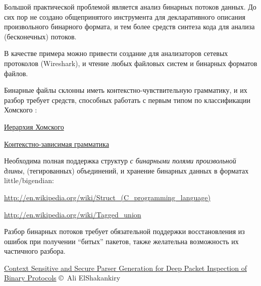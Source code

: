 \label{binparse}

Большой практической проблемой является анализ бинарных потоков данных. До сих
пор не создано общепринятого инструмента для декларативного описания
произвольного бинарного формата, и тем более средств синтеза кода для анализа
(бесконечных) потоков.

В качестве примера можно привести создание  для анализаторов
сетевых протоколов (Wireshark), и чтение любых файловых систем и бинарных
форматов файлов.
 
Бинарные файлы склонны иметь контекстно-чувствительную грамматику, и их разбор
требует средств, способных работать с первым типом по классификации Хомского
\cite{serlex}:

\medskip
\noindent
\href{http://ru.wikipedia.org/wiki/%D0%98%D0%B5%D1%80%D0%B0%D1%80%D1%85%D0%B8%D1%8F_%D0%A5%D0%BE%D0%BC%D1%81%D0%BA%D0%BE%D0%B3%D0%BE}{Иерархия
Хомского} 

\noindent
\href{https://ru.wikipedia.org/wiki/%D0%9A%D0%BE%D0%BD%D1%82%D0%B5%D0%BA%D1%81%D1%82%D0%BD%D0%BE-%D0%B7%D0%B0%D0%B2%D0%B8%D1%81%D0%B8%D0%BC%D0%B0%D1%8F_%D0%B3%D1%80%D0%B0%D0%BC%D0%BC%D0%B0%D1%82%D0%B8%D0%BA%D0%B0}{Контекстно-зависимая
грамматика}

\clearpage
Необходима полная поддержка структур \emph{с бинарными полями произвольной
длины}, (тегированных) объединений, и хранение бинарных данных в форматах
little/bigendian:

\noindent
\url{http://en.wikipedia.org/wiki/Struct_(C_programming_language)}

\noindent
\url{http://en.wikipedia.org/wiki/Tagged_union}

\bigskip
Разбор бинарных потоков требует обязательной поддержки восстановления из
ошибок при получении ``битых'' пакетов, также желательна возможность
их частичного разбора.

\bigskip
\href{https://qspace.library.queensu.ca/bitstream/handle/1974/22040/ElShakankiry_Ali_201708_MSC.pdf}{
Context Sensitive and Secure Parser Generation for
Deep Packet Inspection of Binary Protocols}
\copyright\ Ali ElShakankiry